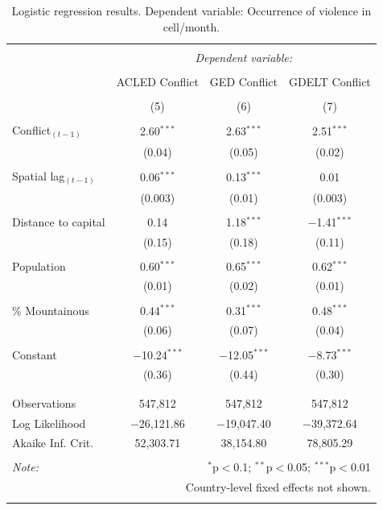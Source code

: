\documentclass[hidelinks]{article}
\begin{document}
\vfill

\begin{table}[!htbp] \centering 
\begin{tabular}{@{\extracolsep{5pt}}lccc} 
\\[-1.8ex]\hline 
\hline \\[-1.8ex] 
 & \multicolumn{3}{c}{\textit{Dependent variable:}} \\ 
\cline{2-4} 
\\[-1.8ex] & ACLED Conflict & GED Conflict & GDELT Conflict \\ 
\\[-1.8ex] & (5) & (6) & (7)\\ 
\hline \\[-1.8ex] 
 Conflict$_{(t-1)}$ & 2.60$^{***}$ & 2.63$^{***}$ & 2.51$^{***}$ \\ 
  & (0.04) & (0.05)  & (0.02) \\ 
  & & & \\ 
 Spatial lag$_{(t-1)}$ & 0.06$^{***}$ & 0.13$^{***}$ & 0.01 \\ 
  & (0.003) & (0.01) & (0.003) \\ 
  & & & \\ 
 Distance to capital & 0.14 & 1.18$^{***}$ & $-$1.41$^{***}$ \\ 
  & (0.15) & (0.18) & (0.11) \\ 
  & & & \\ 
 Population & 0.60$^{***}$ & 0.65$^{***}$ & 0.62$^{***}$ \\ 
  & (0.01) & (0.02) & (0.01) \\ 
  & & & \\ 
 \% Mountainous & 0.44$^{***}$ & 0.31$^{***}$ & 0.48$^{***}$ \\ 
  & (0.06) & (0.07) & (0.04) \\ 
  & & & \\ 
 Constant & $-$10.24$^{***}$ & $-$12.05$^{***}$ & $-$8.73$^{***}$ \\ 
  & (0.36) & (0.44) & (0.30) \\ 
  & & & \\ 
\hline \\[-1.8ex] 
Observations & 547,812 & 547,812 & 547,812 \\ 
Log Likelihood & $-$26,121.86 & $-$19,047.40 & $-$39,372.64 \\ 
Akaike Inf. Crit. & 52,303.71 & 38,154.80 & 78,805.29 \\ 
\hline 
\hline \\[-1.8ex] 
\textit{Note:}  & \multicolumn{3}{r}{$^{*}$p$<$0.1; $^{**}$p$<$0.05; $^{***}$p$<$0.01} \\ 
			& \multicolumn{3}{r}{Country-level fixed effects not shown.} \\ 
\normalsize 
\end{tabular} 
  \caption{Logistic regression results. Dependent variable: Occurrence of violence in cell/month.} \label{tab:regression2} 

\end{table} 
\end{document}

